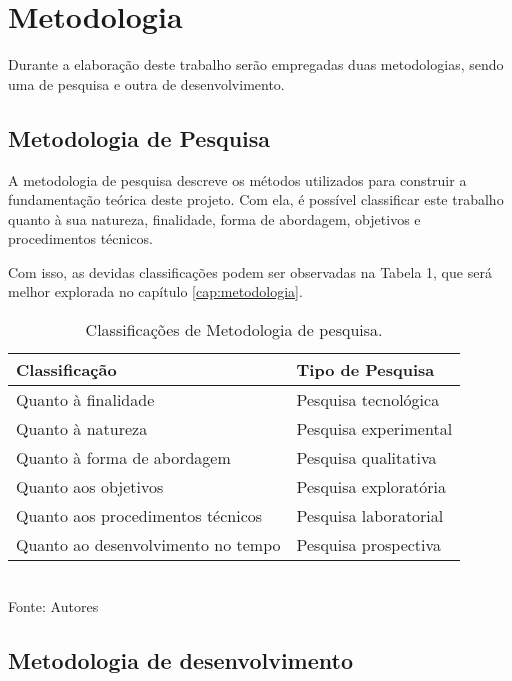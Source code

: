 \section{Metodologia}

Durante a elaboração deste trabalho serão empregadas duas metodologias, sendo uma de pesquisa e outra de desenvolvimento.

\subsection{Metodologia de Pesquisa}

A metodologia de pesquisa descreve os métodos utilizados para construir a fundamentação teórica deste projeto. Com ela, é possível classificar este trabalho quanto à sua natureza, finalidade, forma de abordagem, objetivos e procedimentos técnicos.

Com isso, as devidas classificações podem ser observadas na Tabela 1, que será melhor explorada no capítulo \ref{cap:metodologia}.

\setlength{\extrarowheight}{5pt}

\begin{table}
    \centering
    \caption{Classificações de Metodologia de pesquisa.}
    \begin{tabular}{|l|l|}
        \hline
        \textbf{Classificação}            & \textbf{Tipo de Pesquisa}\\ 
        \hline
        Quanto à finalidade               & Pesquisa tecnológica \\ 
        \hline
        Quanto à natureza                 & Pesquisa experimental \\ 
        \hline
        Quanto à forma de abordagem       & Pesquisa qualitativa \\
        \hline
        Quanto aos objetivos              & Pesquisa exploratória \\
        \hline
        Quanto aos procedimentos técnicos & Pesquisa laboratorial \\        
        \hline
        Quanto ao desenvolvimento no tempo & Pesquisa prospectiva \\     
    \end{tabular}
    \label{tab:tipo_pesquisa}
    \vspace{5mm} \\ 
    {\footnotesize Fonte: Autores} 
\end{table}

\subsection{Metodologia de desenvolvimento}

